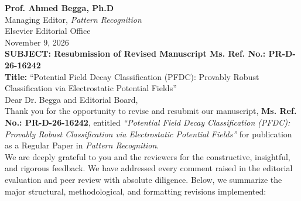 \documentclass[11pt]{article}
\begin{document}
\noindent\textbf{Prof. Ahmed Begga, Ph.D}\\
Managing Editor, \textit{Pattern Recognition}\\
Elsevier Editorial Office\\[1em]
November 9, 2026\\[1em]
\noindent\textbf{SUBJECT: Resubmission of Revised Manuscript Ms. Ref. No.: PR-D-26-16242}\\
\textbf{Title:} ``Potential Field Decay Classification (PFDC): Provably Robust Classification via Electrostatic Potential Fields''\\[1em]
Dear Dr. Begga and Editorial Board,\\[1em]
Thank you for the opportunity to revise and resubmit our manuscript, \textbf{Ms. Ref. No.: PR-D-26-16242}, entitled \textit{``Potential Field Decay Classification (PFDC): Provably Robust Classification via Electrostatic Potential Fields''} for publication as a Regular Paper in \textit{Pattern Recognition}.\\[1em]
We are deeply grateful to you and the reviewers for the constructive, insightful, and rigorous feedback. We have addressed every comment raised in the editorial evaluation and peer review with absolute diligence. Below, we summarize the major structural, methodological, and formatting revisions implemented:
\end{document}
